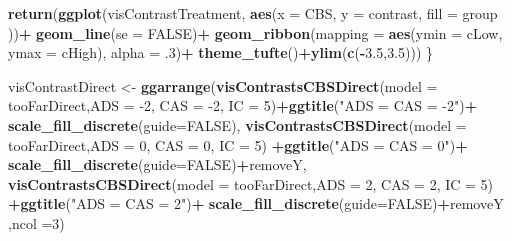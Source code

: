 \documentclass[10pt,dvipsnames,enabledeprecatedfontcommands]{scrartcl}
\newenvironment{Shaded}{\begin{snugshade}}{\end{snugshade}}
\newcommand{\KeywordTok}[1]{\textcolor[rgb]{0.13,0.29,0.53}{\textbf{#1}}}
\newcommand{\DataTypeTok}[1]{\textcolor[rgb]{0.13,0.29,0.53}{#1}}
\newcommand{\DecValTok}[1]{\textcolor[rgb]{0.00,0.00,0.81}{#1}}
\newcommand{\FloatTok}[1]{\textcolor[rgb]{0.00,0.00,0.81}{#1}}
\newcommand{\StringTok}[1]{\textcolor[rgb]{0.31,0.60,0.02}{#1}}
\newcommand{\OtherTok}[1]{\textcolor[rgb]{0.56,0.35,0.01}{#1}}
\newcommand{\OperatorTok}[1]{\textcolor[rgb]{0.81,0.36,0.00}{\textbf{#1}}}
\newcommand{\NormalTok}[1]{#1}
\begin{document}
\begin{Shaded}
\begin{Highlighting}[]
  \KeywordTok{return}\NormalTok{(}\KeywordTok{ggplot}\NormalTok{(visContrastTreatment, }\KeywordTok{aes}\NormalTok{(}\DataTypeTok{x =}\NormalTok{ CBS, }\DataTypeTok{y =}\NormalTok{ contrast, }\DataTypeTok{fill =}\NormalTok{ group ))}\OperatorTok{+}
\StringTok{           }\KeywordTok{geom_line}\NormalTok{(}\DataTypeTok{se =} \OtherTok{FALSE}\NormalTok{)}\OperatorTok{+}
\StringTok{           }\KeywordTok{geom_ribbon}\NormalTok{(}\DataTypeTok{mapping =} 
                         \KeywordTok{aes}\NormalTok{(}\DataTypeTok{ymin =}\NormalTok{ cLow, }\DataTypeTok{ymax =}\NormalTok{ cHigh),  }
                       \DataTypeTok{alpha =} \FloatTok{.3}\NormalTok{)}\OperatorTok{+}
\StringTok{           }\KeywordTok{theme_tufte}\NormalTok{()}\OperatorTok{+}\KeywordTok{ylim}\NormalTok{(}\KeywordTok{c}\NormalTok{(}\OperatorTok{-}\FloatTok{3.5}\NormalTok{,}\FloatTok{3.5}\NormalTok{)))}
\NormalTok{\}}

\NormalTok{visContrastDirect <-}\StringTok{  }\KeywordTok{ggarrange}\NormalTok{(}\KeywordTok{visContrastsCBSDirect}\NormalTok{(}\DataTypeTok{model =}\NormalTok{ tooFarDirect,}\DataTypeTok{ADS =} \DecValTok{-2}\NormalTok{, }\DataTypeTok{CAS =} \DecValTok{-2}\NormalTok{, }\DataTypeTok{IC =} \DecValTok{5}\NormalTok{)}\OperatorTok{+}\KeywordTok{ggtitle}\NormalTok{(}\StringTok{"ADS = CAS = -2"}\NormalTok{)}\OperatorTok{+}\StringTok{ }\KeywordTok{scale_fill_discrete}\NormalTok{(}\DataTypeTok{guide=}\OtherTok{FALSE}\NormalTok{),}
          \KeywordTok{visContrastsCBSDirect}\NormalTok{(}\DataTypeTok{model =}\NormalTok{ tooFarDirect,}\DataTypeTok{ADS =} \DecValTok{0}\NormalTok{, }\DataTypeTok{CAS =} \DecValTok{0}\NormalTok{, }\DataTypeTok{IC =} \DecValTok{5}\NormalTok{) }\OperatorTok{+}\KeywordTok{ggtitle}\NormalTok{(}\StringTok{"ADS = CAS = 0"}\NormalTok{)}\OperatorTok{+}\StringTok{ }\KeywordTok{scale_fill_discrete}\NormalTok{(}\DataTypeTok{guide=}\OtherTok{FALSE}\NormalTok{)}\OperatorTok{+}\NormalTok{removeY,}
          \KeywordTok{visContrastsCBSDirect}\NormalTok{(}\DataTypeTok{model =}\NormalTok{ tooFarDirect,}\DataTypeTok{ADS =} \DecValTok{2}\NormalTok{, }\DataTypeTok{CAS =} \DecValTok{2}\NormalTok{, }\DataTypeTok{IC =} \DecValTok{5}\NormalTok{) }\OperatorTok{+}\KeywordTok{ggtitle}\NormalTok{(}\StringTok{"ADS = CAS = 2"}\NormalTok{)}\OperatorTok{+}\StringTok{ }\KeywordTok{scale_fill_discrete}\NormalTok{(}\DataTypeTok{guide=}\OtherTok{FALSE}\NormalTok{)}\OperatorTok{+}\NormalTok{removeY}
\NormalTok{          ,}\DataTypeTok{ncol =}\DecValTok{3}\NormalTok{)}
\end{Highlighting}
\end{Shaded}
\end{document}
